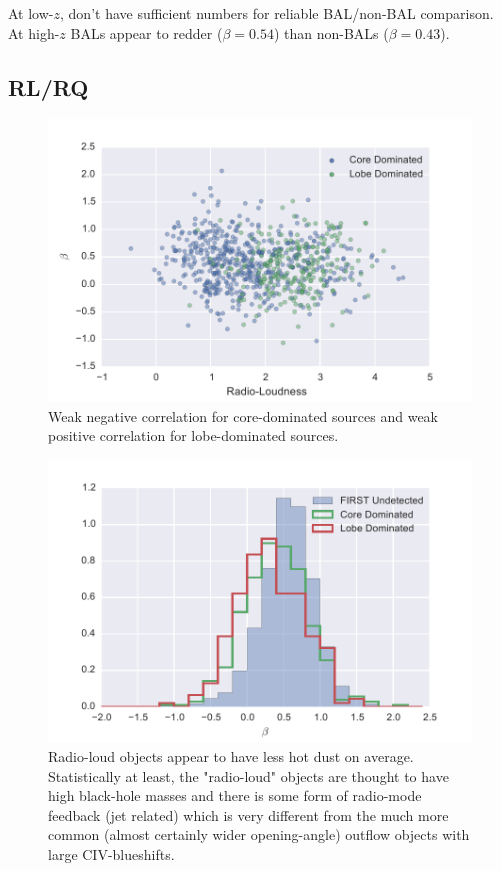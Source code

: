 At low-$z$, don't have sufficient numbers for reliable BAL/non-BAL comparison. At high-$z$ BALs appear to redder ($\beta=0.54$) than non-BALs ($\beta=0.43$). 

\subsection{RL/RQ}

\begin{figure}
\centering
  \includegraphics[width=\columnwidth]{figures/chapter06/radioloudness_beta}
\caption{Weak negative correlation for core-dominated sources and weak positive correlation for lobe-dominated sources.}
  \label{fig:fig}
\end{figure}

\begin{figure}
\centering
  \includegraphics[width=\columnwidth]{figures/chapter06/radiohist}
\caption{Radio-loud objects appear to have less hot dust on average.  Statistically at least, the "radio-loud" objects are thought to have high black-hole masses and there is some form of radio-mode feedback (jet related) which is very different from the much more common (almost certainly wider opening-angle) outflow objects with large CIV-blueshifts.}
  \label{fig:fig}
\end{figure}

